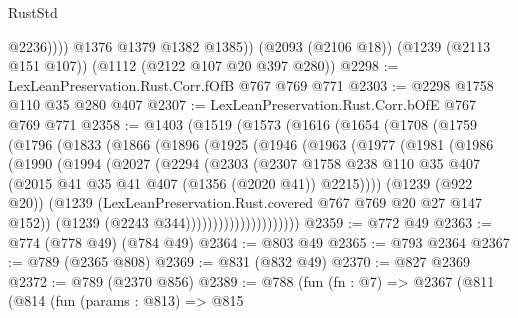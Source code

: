 \begin{lexlean}{RustStd}
\begin{coremodule}
{\begin{coremodule}
{{{{{{{                @2236))))
        @1376
        @1379
        @1382
        @1385))
    (@2093 (@2106 @18))
    (@1239 (@2113 @151 @107))
    (@1112 (@2122 @107 @20 @397 @280))
@2298 := LexLeanPreservation.Rust.Corr.fOfB @767 @769 @771
@2303 := @2298 @1758 @110 @35 @280 @407
@2307 := LexLeanPreservation.Rust.Corr.bOfE @767 @769 @771
@2358 := @1403
    (@1519
      (@1573
        (@1616
          (@1654
            (@1708
              (@1759
                (@1796
                  (@1833
                    (@1866
                      (@1896
                        (@1925
                          (@1946
                            (@1963
                              (@1977
                                (@1981
                                  (@1986
                                    (@1990
                                      (@1994
                                        (@2027
                                          (@2294
                                            (@2303
                                              (@2307
                                                @1758
                                                @238
                                                @110
                                                @35
                                                @407
                                                (@2015
                                                  @41
                                                  @35
                                                  @41
                                                  @407
                                                  (@1356 (@2020 @41))
                                                  @2215))))
                                          (@1239 (@922 @20))
                                          (@1239
                                            (LexLeanPreservation.Rust.covered
                                              @767
                                              @769
                                              @20
                                              @27
                                              @147
                                              @152))
                                          (@1239 (@2243 @344)))))))))))))))))))))
@2359 := @772 @49
@2363 := @774 (@778 @49) (@784 @49)
@2364 := @803 @49
@2365 := @793 @2364
@2367 := @789 (@2365 @808)
@2369 := @831 (@832 @49)
@2370 := @827 @2369
@2372 := @789 (@2370 @856)
@2389 := @788
    (fun (fn : @7) =>
    @2367
      (@811
        (@814
          (fun (params : @813) =>
          @815
}}}}}}}
\end{coremodule}}
\end{coremodule}
\end{lexlean}
